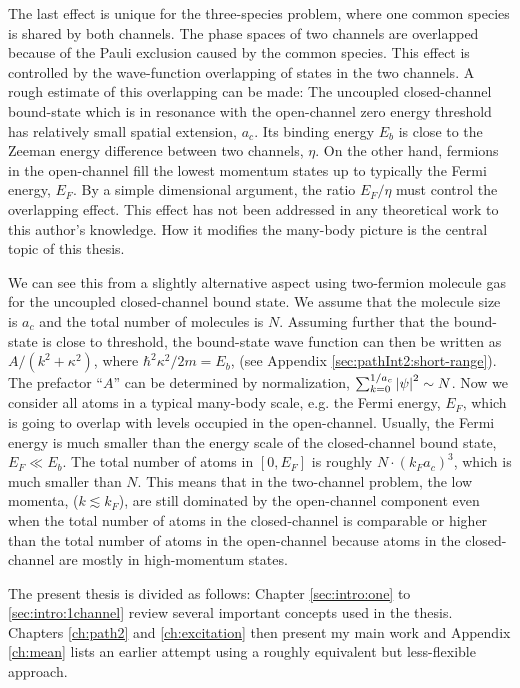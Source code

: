 The last effect is unique for the three-species problem, where one common species is shared by both channels.  The phase spaces of two channels are overlapped because of the Pauli exclusion caused by the common species. This effect is controlled by the wave-function overlapping of states in the two channels. A rough estimate of this overlapping can be made: The uncoupled closed-channel bound-state which is in resonance with the open-channel zero energy threshold has  relatively small  spatial extension, $a_c$.  Its binding energy $E_b$ is close to the Zeeman energy difference between two channels, $\eta$.  On the other hand, fermions in the open-channel fill the lowest  momentum states up to typically the Fermi energy, $E_F$.  By a simple dimensional argument, the ratio $E_F/\eta$ must control the overlapping effect. This effect has  not been addressed in any theoretical work to this author's knowledge.  How it modifies the many-body picture is the central topic of this thesis. 

We can see this from a slightly alternative aspect using two-fermion molecule gas for the uncoupled closed-channel bound state. We assume that the molecule size is $a_{c}$ and the total number of molecules is $N$.  Assuming further that the bound-state is close to threshold,   the bound-state wave function can then be written as $A/(k^{2}+\kappa^{2})$, where $\hbar^{2}\kappa^{2}/2m=E_{b}$, (see Appendix \ref{sec:pathInt2:short-range}). The prefactor ``$A$'' can be determined  by normalization, $\sum_{k=0}^{1/a_{c}}\left\lvert{\psi}\right\rvert^{2}\sim{}N$. Now  we consider all atoms in a typical many-body scale, e.g. the Fermi energy, $E_{F}$, which is going to overlap with levels occupied in the open-channel. Usually, the Fermi energy is much smaller than the energy scale of the closed-channel bound state, $E_{F}\ll{}E_b$.  The total number of atoms in $[0,E_F]$ is roughly $N\cdot(k_{F}a_{c})^{3}$, which is much smaller than $N$. This means that in the two-channel problem, the low momenta,  ($k\lesssim{}k_F$), are still dominated by the open-channel component even when the total number of atoms in the closed-channel is comparable or higher than the total number  of atoms in the open-channel because atoms in the closed-channel are mostly in  high-momentum states.     

The present thesis is divided as follows:
Chapter \ref{sec:intro:one} to  \ref{sec:intro:1channel} review several important concepts used in the thesis.  Chapters \ref{ch:path2} and \ref{ch:excitation} then present my main work  and Appendix \ref{ch:mean}  lists an earlier attempt using a roughly equivalent but less-flexible approach.  

